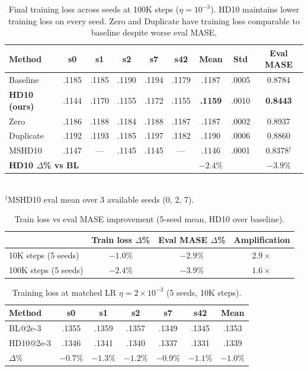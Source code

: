 \documentclass{article}
\begin{document}
\begin{table}[h]
\centering
\caption{Final training loss across seeds at 100K steps ($\eta = 10^{-3}$). HD10 maintains lower training loss on every seed. Zero and Duplicate have training loss comparable to baseline despite worse eval MASE.}
\label{tab:trainloss_100k}
\small
\begin{tabular}{lcccccccc}
\toprule
\textbf{Method} & \textbf{s0} & \textbf{s1} & \textbf{s2} & \textbf{s7} & \textbf{s42} & \textbf{Mean} & \textbf{Std} & \textbf{Eval MASE} \\
\midrule
Baseline & .1185 & .1185 & .1190 & .1194 & .1179 & .1187 & .0005 & 0.8784 \\
\textbf{HD10 (ours)} & .1144 & .1170 & .1155 & .1172 & .1155 & \textbf{.1159} & .0010 & \textbf{0.8443} \\
Zero & .1186 & .1188 & .1184 & .1188 & .1187 & .1187 & .0002 & 0.8937 \\
Duplicate & .1192 & .1193 & .1185 & .1197 & .1182 & .1190 & .0006 & 0.8860 \\
MSHD10 & .1147 & --- & .1145 & .1145 & --- & .1146 & .0001 & 0.8378$^\dagger$ \\
\midrule
\multicolumn{2}{l}{\textbf{HD10 $\Delta$\% vs BL}} & & & & & $-2.4\%$ & & $-3.9\%$ \\
\bottomrule
\end{tabular}
\\[2pt]
{\footnotesize $^\dagger$MSHD10 eval mean over 3 available seeds (0, 2, 7).}
\end{table}

\begin{table}[h]
\centering
\caption{Train loss vs eval MASE improvement (5-seed mean, HD10 over baseline).}
\label{tab:traineval_gap}
\small
\begin{tabular}{lccc}
\toprule
& \textbf{Train loss $\Delta$\%} & \textbf{Eval MASE $\Delta$\%} & \textbf{Amplification} \\
\midrule
10K steps (5 seeds) & $-1.0\%$ & $-2.9\%$ & $2.9\times$ \\
100K steps (5 seeds) & $-2.4\%$ & $-3.9\%$ & $1.6\times$ \\
\bottomrule
\end{tabular}
\end{table}

\begin{table}[h]
\centering
\caption{Training loss at matched LR $\eta = 2 \times 10^{-3}$ (5 seeds, 10K steps).}
\label{tab:trainloss_matchedlr}
\small
\begin{tabular}{lcccccc}
\toprule
\textbf{Method} & \textbf{s0} & \textbf{s1} & \textbf{s2} & \textbf{s7} & \textbf{s42} & \textbf{Mean} \\
\midrule
BL@2e-3 & .1355 & .1359 & .1357 & .1349 & .1345 & .1353 \\
HD10@2e-3 & .1346 & .1341 & .1340 & .1337 & .1331 & .1339 \\
\midrule
$\Delta$\% & $-0.7\%$ & $-1.3\%$ & $-1.2\%$ & $-0.9\%$ & $-1.1\%$ & $-1.0\%$ \\
\bottomrule
\end{tabular}
\end{table}
\end{document}
